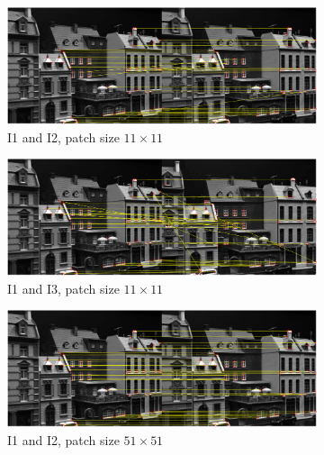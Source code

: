 \documentclass[11pt,a4paper]{article}
\begin{document}
\begin{figure}[h]
    \centering
    \begin{subfigure}[t]{0.9\textwidth}
        \includegraphics[width=\textwidth]{images/match_i1_i2_harris.pdf}
        \caption{I1 and I2, patch size $11\times11$}
        \label{fig:i1_i2_harris_11}
    \end{subfigure}
    \begin{subfigure}[t]{0.9\textwidth}
        \centering
        \includegraphics[width=\textwidth]{images/match_i1_i3_harris.pdf}
        \caption{I1 and I3, patch size $11\times11$}
        \label{fig:i1_i3_harris_11}
    \end{subfigure}
    \begin{subfigure}[t]{0.9\textwidth}
        \centering
        \includegraphics[width=\textwidth]{images/match_i1_i2_harris_51.pdf}
        \caption{I1 and I2, patch size $51\times51$}
        \label{fig:i1_i2_harris_51}
    \end{subfigure}
    \begin{subfigure}[t]{0.9\textwidth}

\end{subfigure}
\end{figure}
\end{document}
